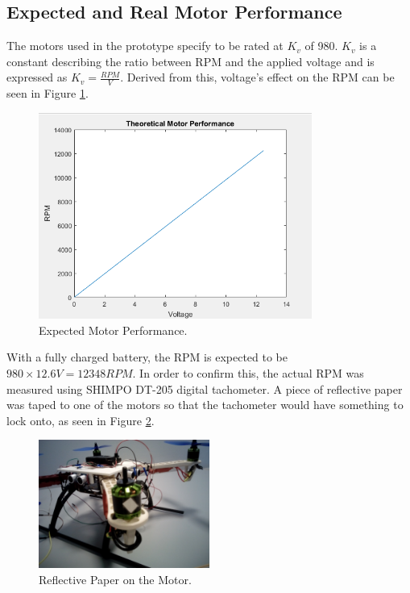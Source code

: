\subsection{Expected and Real Motor Performance}
The motors used in the prototype specify to be rated at $K_v$ of 980. $K_v$ is a constant describing the ratio between RPM and the applied voltage and is expressed as $K_v = \frac{RPM}{V}$. Derived from this, voltage's effect on the RPM can be seen in Figure \ref{KvPlot}.
\begin{figure}[H]
  \centering
    \includegraphics[width=0.8\textwidth]{images/KvPlot.png}
	\caption{Expected Motor Performance.}
	\label{KvPlot}
\end{figure}
With a fully charged battery, the RPM is expected to be $980\times 12.6V = 12348 RPM$.
In order to confirm this, the actual RPM was measured using SHIMPO DT-205 digital tachometer. A piece of reflective paper was taped to one of the motors so that the tachometer would have something to lock onto, as seen in Figure \ref{tachometer}.

\begin{figure}[H]
  \centering
    \includegraphics[width=0.5\textwidth]{images/tachometer.jpg}
	\caption{Reflective Paper on the Motor.}
	\label{tachometer}
\end{figure}

